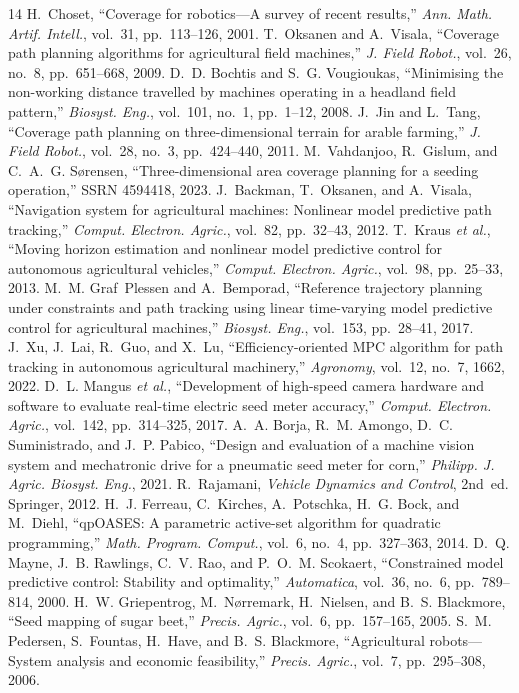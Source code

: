 \documentclass[11pt,a4paper]{article}
\begin{document}
\begin{thebibliography}{14}
H.~Choset, ``Coverage for robotics---A survey of recent results,'' \emph{Ann. Math. Artif. Intell.}, vol.~31, pp.~113--126, 2001.
T.~Oksanen and A.~Visala, ``Coverage path planning algorithms for agricultural field machines,'' \emph{J. Field Robot.}, vol.~26, no.~8, pp.~651--668, 2009.
D.~D. Bochtis and S.~G. Vougioukas, ``Minimising the non-working distance travelled by machines operating in a headland field pattern,'' \emph{Biosyst. Eng.}, vol.~101, no.~1, pp.~1--12, 2008.
J.~Jin and L.~Tang, ``Coverage path planning on three-dimensional terrain for arable farming,'' \emph{J. Field Robot.}, vol.~28, no.~3, pp.~424--440, 2011.
M.~Vahdanjoo, R.~Gislum, and C.~A.~G. S{\o}rensen, ``Three-dimensional area coverage planning for a seeding operation,'' SSRN 4594418, 2023.
J.~Backman, T.~Oksanen, and A.~Visala, ``Navigation system for agricultural machines: Nonlinear model predictive path tracking,'' \emph{Comput. Electron. Agric.}, vol.~82, pp.~32--43, 2012.
T.~Kraus \emph{et al.}, ``Moving horizon estimation and nonlinear model predictive control for autonomous agricultural vehicles,'' \emph{Comput. Electron. Agric.}, vol.~98, pp.~25--33, 2013.
M.~M. Graf~Plessen and A.~Bemporad, ``Reference trajectory planning under constraints and path tracking using linear time-varying model predictive control for agricultural machines,'' \emph{Biosyst. Eng.}, vol.~153, pp.~28--41, 2017.
J.~Xu, J.~Lai, R.~Guo, and X.~Lu, ``Efficiency-oriented MPC algorithm for path tracking in autonomous agricultural machinery,'' \emph{Agronomy}, vol.~12, no.~7, 1662, 2022.
D.~L. Mangus \emph{et al.}, ``Development of high-speed camera hardware and software to evaluate real-time electric seed meter accuracy,'' \emph{Comput. Electron. Agric.}, vol.~142, pp.~314--325, 2017.
A.~A. Borja, R.~M. Amongo, D.~C. Suministrado, and J.~P. Pabico, ``Design and evaluation of a machine vision system and mechatronic drive for a pneumatic seed meter for corn,'' \emph{Philipp. J. Agric. Biosyst. Eng.}, 2021.
R.~Rajamani, \emph{Vehicle Dynamics and Control}, 2nd~ed. Springer, 2012.
H.~J. Ferreau, C.~Kirches, A.~Potschka, H.~G. Bock, and M.~Diehl, ``qpOASES: A parametric active-set algorithm for quadratic programming,'' \emph{Math. Program. Comput.}, vol.~6, no.~4, pp.~327--363, 2014.
D.~Q. Mayne, J.~B. Rawlings, C.~V. Rao, and P.~O.~M. Scokaert, ``Constrained model predictive control: Stability and optimality,'' \emph{Automatica}, vol.~36, no.~6, pp.~789--814, 2000.
H.~W. Griepentrog, M.~N{\o}rremark, H.~Nielsen, and B.~S. Blackmore, ``Seed mapping of sugar beet,'' \emph{Precis. Agric.}, vol.~6, pp.~157--165, 2005.
S.~M. Pedersen, S.~Fountas, H.~Have, and B.~S. Blackmore, ``Agricultural robots---System analysis and economic feasibility,'' \emph{Precis. Agric.}, vol.~7, pp.~295--308, 2006.
\end{thebibliography}
\end{document}
